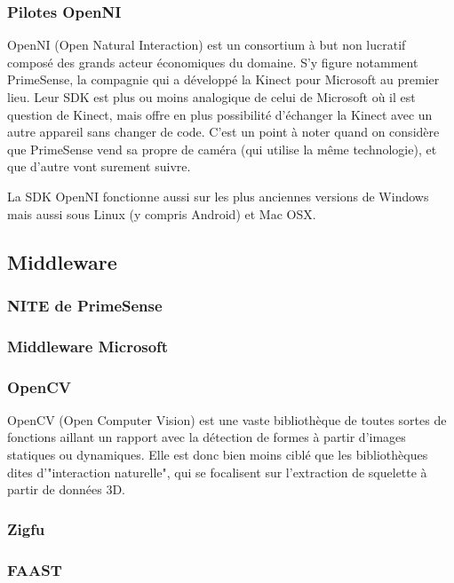 \documentclass[french,12pt]{report}
\begin{document}
  \subsubsection{Pilotes OpenNI}
	OpenNI (Open Natural Interaction) est un consortium à but non lucratif composé
	des grands acteur économiques du domaine. S'y figure notamment PrimeSense, la 
	compagnie qui a développé la Kinect pour Microsoft au premier lieu. Leur SDK
	est plus ou moins analogique de celui de Microsoft où il est question de
	Kinect, mais 
	offre en plus possibilité d'échanger la Kinect avec un autre appareil sans
	changer de code. C'est un point à noter quand on considère que PrimeSense vend
  sa propre de caméra (qui utilise la même technologie), et que d'autre vont 
  surement suivre.
	
	La SDK OpenNI fonctionne aussi sur les plus anciennes versions de Windows mais
	aussi sous Linux (y compris Android) et Mac OSX.
	
	
	\subsection{Middleware}
	
	\subsubsection{NITE de PrimeSense}
	\subsubsection{Middleware Microsoft}  
  \subsubsection{OpenCV}
  OpenCV (Open Computer Vision) est une vaste bibliothèque de toutes sortes de 
  fonctions aillant un rapport avec la détection de formes à partir d'images
  statiques ou dynamiques. Elle est donc bien moins ciblé que les bibliothèques
  dites d'"interaction naturelle", qui se focalisent sur l'extraction de 
  squelette à partir de données 3D.
  \subsubsection{Zigfu}
  \subsubsection{FAAST}
\end{document}
